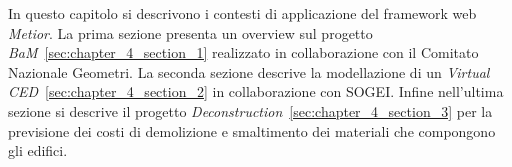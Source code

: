 In questo capitolo si descrivono i contesti di applicazione del framework web \emph{Metior}.
La prima sezione presenta un overview sul progetto \emph{BaM}~\ref{sec:chapter_4_section_1} realizzato
in collaborazione con il Comitato Nazionale Geometri.
La seconda sezione descrive la modellazione di un \emph{Virtual CED}~\ref{sec:chapter_4_section_2} in collaborazione con SOGEI.
Infine nell'ultima sezione si descrive il progetto \emph{Deconstruction}~\ref{sec:chapter_4_section_3} per la previsione dei
costi di demolizione e smaltimento dei materiali che compongono gli edifici.
